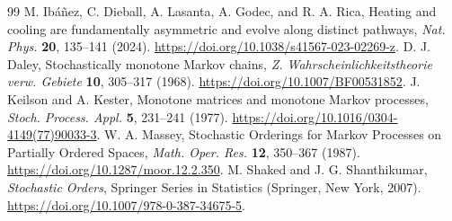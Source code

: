 \documentclass[11pt,a4paper]{article}
\theoremstyle{remark}\newtheorem{remark}[theorem]{Remark}
\begin{document}
\begin{thebibliography}{99}
M. Ib\'a\~nez, C. Dieball, A. Lasanta, A. Godec, and R. A. Rica, Heating and cooling are fundamentally asymmetric and evolve along distinct pathways, \emph{Nat. Phys.} \textbf{20}, 135--141 (2024). \url{https://doi.org/10.1038/s41567-023-02269-z}.
D. J. Daley, Stochastically monotone Markov chains, \emph{Z. Wahrscheinlichkeitstheorie verw. Gebiete} \textbf{10}, 305--317 (1968). \url{https://doi.org/10.1007/BF00531852}.
J. Keilson and A. Kester, Monotone matrices and monotone Markov processes, \emph{Stoch. Process. Appl.} \textbf{5}, 231--241 (1977). \url{https://doi.org/10.1016/0304-4149(77)90033-3}.
W. A. Massey, Stochastic Orderings for Markov Processes on Partially Ordered Spaces, \emph{Math. Oper. Res.} \textbf{12}, 350--367 (1987). \url{https://doi.org/10.1287/moor.12.2.350}.
M. Shaked and J. G. Shanthikumar, \emph{Stochastic Orders}, Springer Series in Statistics (Springer, New York, 2007). \url{https://doi.org/10.1007/978-0-387-34675-5}.
\end{thebibliography}
\end{document}
